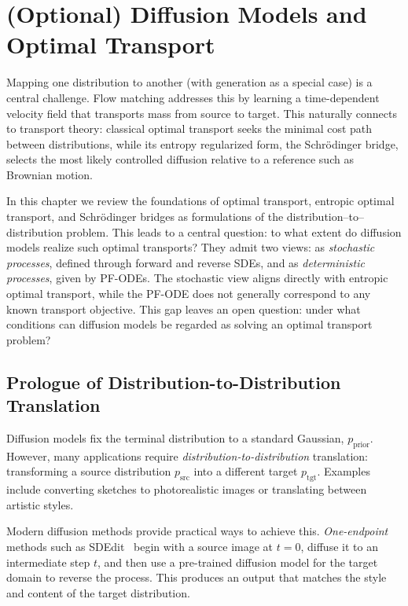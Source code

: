 \chapter{(Optional) Diffusion Models and Optimal Transport}\label{ch:ot-eot}



Mapping one distribution to another (with generation as a special case) 
is a central challenge. Flow matching addresses this by learning a 
time-dependent velocity field that transports mass from source to target. 
This naturally connects to transport theory: classical optimal transport 
seeks the minimal cost path between distributions, while its entropy 
regularized form, the Schr\"odinger bridge, selects the most likely 
controlled diffusion relative to a reference such as Brownian motion. 

In this chapter we review the foundations of optimal transport, entropic 
optimal transport, and Schr\"odinger bridges as formulations of the 
distribution–to–distribution problem. This leads to a central question: 
to what extent do diffusion models realize such optimal transports? 
They admit two views: as \emph{stochastic processes}, defined through 
forward and reverse SDEs, and as \emph{deterministic processes}, given 
by PF-ODEs. The stochastic view aligns directly with 
entropic optimal transport, while the PF-ODE does not 
generally correspond to any known transport objective. This gap leaves 
an open question: under what conditions can diffusion models be regarded 
as solving an optimal transport problem?




\newpage
\section{Prologue of Distribution-to-Distribution Translation} 
Diffusion models fix the terminal distribution to a standard Gaussian, $p_{\mathrm{prior}}$.  
However, many applications require \emph{distribution-to-distribution} translation: transforming a source distribution $p_{\mathrm{src}}$ into a different target $p_{\mathrm{tgt}}$.  
Examples include converting sketches to photorealistic images or translating between artistic styles.

Modern diffusion methods provide practical ways to achieve this.  
\emph{One-endpoint} methods such as SDEdit~\citep{meng2021sdedit} begin with a source image at $t=0$, diffuse it to an intermediate step $t$, and then use a pre-trained diffusion model for the target domain to reverse the process.  
This produces an output that matches the style and content of the target distribution.  

